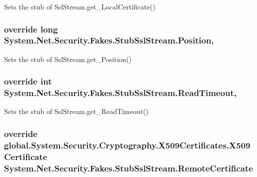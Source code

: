 Sets the stub of Ssl\-Stream.\-get\-\_\-\-Local\-Certificate()

\hypertarget{class_system_1_1_net_1_1_security_1_1_fakes_1_1_stub_ssl_stream_a548f8461c2e82d12da560e90ac42f7d2}{
\subsubsection[{Position}]{\setlength{\rightskip}{0pt plus 5cm}override long System.\-Net.\-Security.\-Fakes.\-Stub\-Ssl\-Stream.\-Position\hspace{0.3cm}{\ttfamily [get]}, {\ttfamily [set]}}}\label{class_system_1_1_net_1_1_security_1_1_fakes_1_1_stub_ssl_stream_a548f8461c2e82d12da560e90ac42f7d2}


Sets the stub of Ssl\-Stream.\-get\-\_\-\-Position()

\hypertarget{class_system_1_1_net_1_1_security_1_1_fakes_1_1_stub_ssl_stream_a74ed283ded0e55635c990554d0c6d9f4}{
\subsubsection[{Read\-Timeout}]{\setlength{\rightskip}{0pt plus 5cm}override int System.\-Net.\-Security.\-Fakes.\-Stub\-Ssl\-Stream.\-Read\-Timeout\hspace{0.3cm}{\ttfamily [get]}, {\ttfamily [set]}}}\label{class_system_1_1_net_1_1_security_1_1_fakes_1_1_stub_ssl_stream_a74ed283ded0e55635c990554d0c6d9f4}


Sets the stub of Ssl\-Stream.\-get\-\_\-\-Read\-Timeout()

\hypertarget{class_system_1_1_net_1_1_security_1_1_fakes_1_1_stub_ssl_stream_a55db21f115ebb317f7221da7a766b664}{
\subsubsection[{Remote\-Certificate}]{\setlength{\rightskip}{0pt plus 5cm}override global.\-System.\-Security.\-Cryptography.\-X509\-Certificates.\-X509\-Certificate System.\-Net.\-Security.\-Fakes.\-Stub\-Ssl\-Stream.\-Remote\-Certificate\hspace{0.3cm}{\ttfamily [get]}}}\label{class_system_1_1_net_1_1_security_1_1_fakes_1_1_stub_ssl_stream_a55db21f115ebb317f7221da7a766b664}


